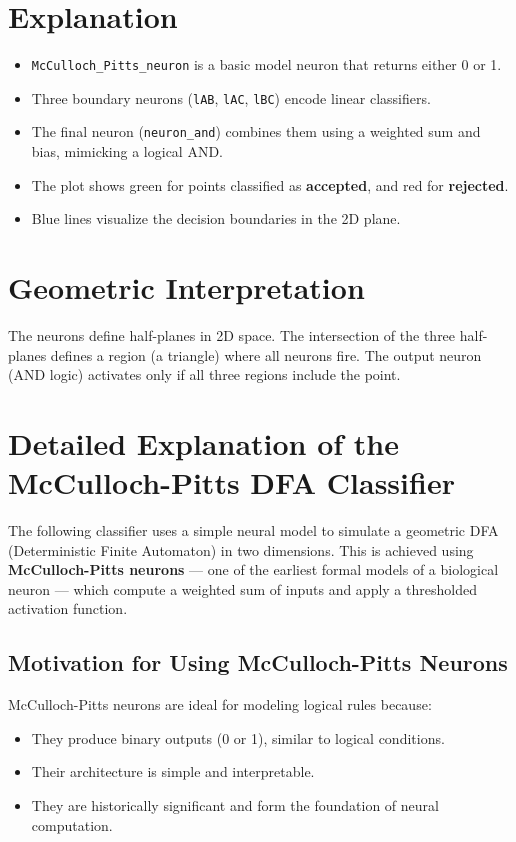 \documentclass{article}
\begin{document}
\section*{Explanation}
\begin{itemize}
  \item \texttt{McCulloch\_Pitts\_neuron} is a basic model neuron that returns either 0 or 1.
  \item Three boundary neurons (\texttt{lAB}, \texttt{lAC}, \texttt{lBC}) encode linear classifiers.
  \item The final neuron (\texttt{neuron\_and}) combines them using a weighted sum and bias, mimicking a logical AND.
  \item The plot shows green for points classified as \textbf{accepted}, and red for \textbf{rejected}.
  \item Blue lines visualize the decision boundaries in the 2D plane.
\end{itemize}

\section*{Geometric Interpretation}
The neurons define half-planes in 2D space. The intersection of the three half-planes defines a region (a triangle) where all neurons fire. The output neuron (AND logic) activates only if all three regions include the point.


\section{Detailed Explanation of the McCulloch-Pitts DFA Classifier}

The following classifier uses a simple neural model to simulate a geometric DFA (Deterministic Finite Automaton) in two dimensions. This is achieved using \textbf{McCulloch-Pitts neurons} — one of the earliest formal models of a biological neuron — which compute a weighted sum of inputs and apply a thresholded activation function.

\subsection*{Motivation for Using McCulloch-Pitts Neurons}

McCulloch-Pitts neurons are ideal for modeling logical rules because:
\begin{itemize}
    \item They produce binary outputs (0 or 1), similar to logical conditions.
    \item Their architecture is simple and interpretable.
    \item They are historically significant and form the foundation of neural computation.
\end{itemize}
\end{document}

